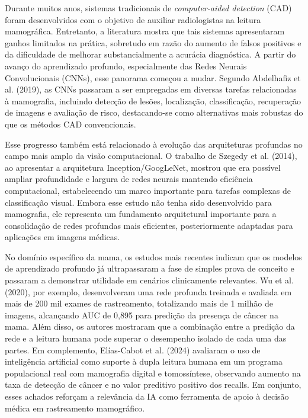 \documentclass[
    12pt,
    openright,
    oneside,
    a4paper,
    english,
    brazil
]{abntex2}
\begin{document}
Durante muitos anos, sistemas tradicionais de \textit{computer-aided detection} (CAD) foram desenvolvidos com o objetivo de auxiliar radiologistas na leitura mamográfica. Entretanto, a literatura mostra que tais sistemas apresentaram ganhos limitados na prática, sobretudo em razão do aumento de falsos positivos e da dificuldade de melhorar substancialmente a acurácia diagnóstica. A partir do avanço do aprendizado profundo, especialmente das Redes Neurais Convolucionais (CNNs), esse panorama começou a mudar. Segundo Abdelhafiz et al. (2019), as CNNs passaram a ser empregadas em diversas tarefas relacionadas à mamografia, incluindo detecção de lesões, localização, classificação, recuperação de imagens e avaliação de risco, destacando-se como alternativas mais robustas do que os métodos CAD convencionais.

Esse progresso também está relacionado à evolução das arquiteturas profundas no campo mais amplo da visão computacional. O trabalho de Szegedy et al. (2014), ao apresentar a arquitetura Inception/GoogLeNet, mostrou que era possível ampliar profundidade e largura de redes neurais mantendo eficiência computacional, estabelecendo um marco importante para tarefas complexas de classificação visual. Embora esse estudo não tenha sido desenvolvido para mamografia, ele representa um fundamento arquitetural importante para a consolidação de redes profundas mais eficientes, posteriormente adaptadas para aplicações em imagens médicas.

No domínio específico da mama, os estudos mais recentes indicam que os modelos de aprendizado profundo já ultrapassaram a fase de simples prova de conceito e passaram a demonstrar utilidade em cenários clinicamente relevantes. Wu et al. (2020), por exemplo, desenvolveram uma rede profunda treinada e avaliada em mais de 200 mil exames de rastreamento, totalizando mais de 1 milhão de imagens, alcançando AUC de 0,895 para predição da presença de câncer na mama. Além disso, os autores mostraram que a combinação entre a predição da rede e a leitura humana pode superar o desempenho isolado de cada uma das partes. Em complemento, Elías-Cabot et al. (2024) avaliaram o uso de inteligência artificial como suporte à dupla leitura humana em um programa populacional real com mamografia digital e tomossíntese, observando aumento na taxa de detecção de câncer e no valor preditivo positivo dos recalls. Em conjunto, esses achados reforçam a relevância da IA como ferramenta de apoio à decisão médica em rastreamento mamográfico.
\end{document}

